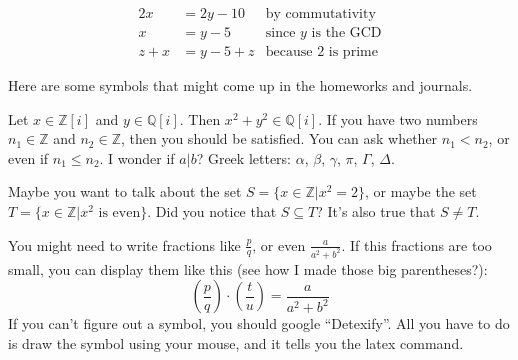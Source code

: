 \documentclass[11pt]{article}
\theoremstyle{quest}
\newcommand{\Q}{\mathbb{Q}}
\newcommand{\Z}{\mathbb{Z}}
\begin{document}
\begin{align*}
  2x &= 2y-10 & \text{by commutativity} \\
  x &=y-5  & \text{since $y$ is the GCD}\\
  z+x &= y-5+z & \text{because 2 is prime}
\end{align*}

Here are some symbols that might come up in the homeworks and journals.

Let $x\in \Z[i]$ and $y\in \Q[i]$. Then $x^2+y^2\in \Q[i]$. If you have two numbers $n_1\in \Z$ and $n_2\in \Z$, then you should be satisfied. You can ask whether $n_1 < n_2$, or even if $n_1 \leq n_2$. I wonder if $a|b$? Greek letters: $\alpha$, $\beta$, $\gamma$, $\pi$, $\Gamma$, $\Delta$.

Maybe you want to talk about the set $S=\{ x\in \Z | x^2 = 2\}$, or maybe the set $T=\{ x\in \Z | x^2 \text{ is even}\}$. Did you notice that $S\subseteq T$? It's also true that $S \neq T$.

You might need to write fractions like $\frac{p}{q}$, or even $\frac{a}{a^2+b^2}$. If this fractions are too small, you can display them like this (see how I made those big parentheses?):
\[\left(\frac{p}{q}\right)\cdot \left(\frac{t}{u}\right) = \frac{a}{a^2+b^2}\]
If you can't figure out a symbol, you should google ``Detexify''. All you have to do is draw the symbol using your mouse, and it tells you the latex command.
\end{document}
